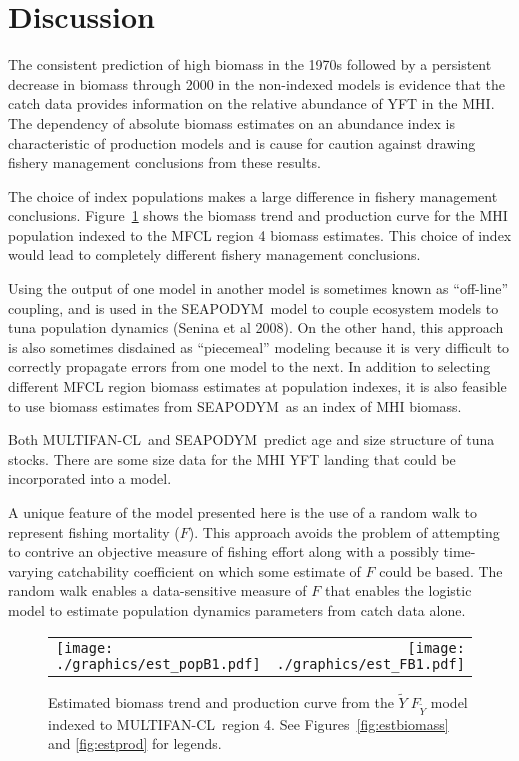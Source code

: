 \documentclass[12pt,letterpaper,twoside]{article}
\newcommand\SD{SEAPODYM}
\newcommand\MFCL{MULTIFAN-CL}
\newcommand\help[1]{\color{Magenta}{\it #1 }\normalcolor}
\newcommand\MSY{\widetilde{Y}}
\newcommand\Fmsy{F_{\MSY}}
\newcommand\MSYFmsy{\MSY\;\Fmsy}
\begin{document}
\section{Discussion}
The consistent prediction of high biomass in the 1970s followed by a
persistent decrease in biomass through 2000 in the non-indexed models
is evidence that the catch data provides information on
the relative abundance of YFT in the MHI. The dependency of absolute
biomass estimates on an abundance index is characteristic of
production models \help{(references)} and is cause for caution
against drawing fishery management conclusions from these results. 

The choice of index populations makes a large difference in fishery management
conclusions. Figure~\ref{fig:estr4} shows the biomass trend and
production curve for the MHI population indexed to the MFCL region 4
biomass estimates. This choice of index would lead to completely
different fishery management conclusions.

Using the output of one model in another model is sometimes known as
``off-line'' coupling, and is used in the \SD\ model to couple
ecosystem models to tuna population dynamics (Senina et al 2008).
On the other hand, this approach is also sometimes disdained as ``piecemeal''
modeling because it is very difficult to correctly propagate errors from one
model to the next. In addition to selecting different MFCL region
biomass estimates at population indexes, it is also feasible to use
biomass estimates from \SD\ as an index of MHI biomass.

Both \MFCL\ and \SD\ predict age and size structure of tuna stocks.
There are some size data for the MHI YFT landing that could be
incorporated into a model.

A unique feature of the model presented here is the use of a random
walk to represent fishing mortality ($F$). This approach avoids the problem
of attempting to contrive an objective measure of fishing effort
along with a possibly time-varying catchability coefficient
on which some estimate of $F$ could be based. The random walk enables
a data-sensitive measure of $F$ that enables the logistic model
to estimate population dynamics parameters from catch data alone.

\begin{figure}
\begin{center}
\begin{tabular}{lr}
\texttt{[image: ./graphics/est\_popB1.pdf]}&
\texttt{[image: ./graphics/est\_FB1.pdf]}\\
\end{tabular}
\end{center}
\caption{\label{fig:estr4}
Estimated biomass trend and production curve from the $\MSYFmsy$
model indexed to \MFCL\ region 4. 
See Figures~\ref{fig:estbiomass} and \ref{fig:estprod} for legends.
}
\end{figure}
\end{document}
